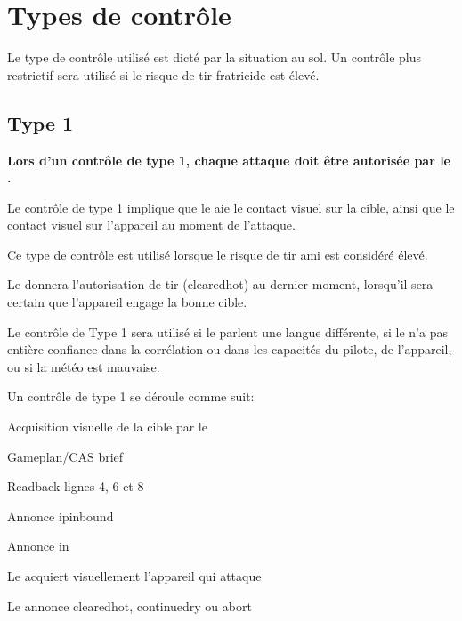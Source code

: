 \newpage
\section{Types de contrôle}
\label{controltypessection}

Le type de contrôle utilisé est dicté par la situation au sol. Un contrôle plus restrictif sera utilisé si le risque de tir fratricide est élevé.



\subsection{Type 1}
\e
    \item \textbf{Lors d'un contrôle de type 1, chaque attaque doit être autorisée par le \ja{}.}
    \item Le contrôle de type 1 implique que le \ja{} aie le contact visuel sur la cible, ainsi que le contact visuel sur l'appareil au moment de l'attaque.
    \item Ce type de contrôle est utilisé lorsque le risque de tir ami est considéré élevé.
    \item Le \ja{} donnera l'autorisation de tir (\acrshort{clearedhot}) au dernier moment, lorsqu'il sera certain que l'appareil engage la bonne cible.
    \item Le contrôle de Type 1 sera utilisé si le \ja{} parlent une langue différente, si le \ja{} n'a pas entière confiance dans la corrélation ou dans les capacités du pilote, de l'appareil, ou si la météo est mauvaise.\vskip5mm
    \item Un contrôle de type 1 se déroule comme suit:
    \ee
        \item Acquisition visuelle de la cible par le \ja{}
        \item Gameplan/CAS brief
        \item Readback lignes 4, 6 et 8
        \item Annonce \acrshort{ipinbound}
        \item Annonce \acrshort{in}
        \item Le \ja{} acquiert visuellement l'appareil qui attaque
        \item Le \ja{} annonce \acrshort{clearedhot}, \acrshort{continuedry} ou \acrshort{abort}
    \ed
\ed

